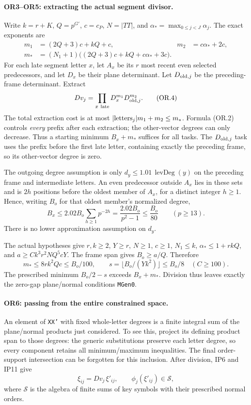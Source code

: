 \documentclass[11pt,a4paper]{article}
\numberwithin{equation}{section}
\theoremstyle{remark}\newtheorem{remark}[theorem]{Remark}
\begin{document}
\paragraph{OR3--OR5: extracting the actual segment divisor.}
Write $k=r+K$, $Q=p^{G'}$, $c=c_P$, $N=|TT|$, and
$\alpha_*=\max_{0\le j<J}\alpha_j$. The exact exponents are
\[
\begin{aligned}
m_1&=(2Q+3)c+kQ+c,&m_2&=c\alpha_*+2c,\\
m_*&=(N_1+1)\bigl((2Q+3)c+kQ+c\alpha_*+3c\bigr).
\end{aligned}                                                   \tag{OR.3}
\]
For each late segment letter $x$, let $A_x$ be its $r$ most recent even
selected predecessors, and let $D_x$ be their plane determinant.
Let $D_{{\rm old},j}$ be the preceding-frame determinant. Extract
\[
                 Dv_j=\prod_{x\ {\rm late}}D_x^{m_1}D_{{\rm old},j}^{m_2}.
                                                               \tag{OR.4}
\]
The total extraction cost is at most $|{\rm letters}_j|m_1+m_2\le m_*$.
Formula (OR.2) controls \emph{every} prefix after each extraction; the
other-vector degrees can only decrease. Thus a starting minimum
$B_x+m_*$ suffices for all tasks. The $D_{{\rm old},j}$ task uses the prefix before
the first late letter, containing exactly the preceding frame, so its
other-vector degree is zero.

The outgoing degree assumption is only $d_y\le1.01\,\operatorname{levDeg}(y)$
on the preceding frame and intermediate letters. An even predecessor
outside $A_x$ lies in these sets and is $2h$ positions before the oldest
member of $A_x$, for a distinct integer $h\ge1$. Hence, writing $B_o$ for
that oldest member's normalized degree,
\[
 B_x\le2.02B_o\sum_{h\ge1}p^{-2h}
       =\frac{2.02B_o}{p^2-1}\le\frac{B_o}{80}
       \qquad(p\ge13).                                    \tag{OR.5}
\]
There is no lower approximation assumption on $d_y$.

The actual hypotheses give $r,k\ge2$, $Y\ge r$, $N\ge1$, $c\ge1$,
$N_1\le k$, $\alpha_*\le1+rkQ$, and
$a\ge Ck^3r^2NQ^5cY$. The frame span gives $B_o\ge a/Q$. Therefore
\[
 m_*\le8rk^2Qc\le B_o/100,\qquad
 s=\lfloor B_o/(Yk^2)\rfloor\le B_o/8
 \quad(C\ge100).
\]
The prescribed minimum $B_o/2-s$ exceeds $B_x+m_*$.
Division thus leaves exactly the zero-gap plane/normal conditions
\texttt{MGen0}.

\paragraph{OR6: passing from the entire constrained space.}
An element of \texttt{XX'} with fixed whole-letter degrees is a finite
integral sum of the plane/normal products just considered. To see this,
project its defining product span to those degrees: the generic
substitutions preserve each letter degree, so every component retains all
minimum/maximum inequalities. The final order-support intersection can
be forgotten for this inclusion. After division, IP6 and IP11 give
\[
 \xi_{ij}=Dv_j\,\xi'_{ij},\qquad
 \phi_j(\xi'_{ij})\in\mathcal S,
\]
where $\mathcal S$ is the algebra of finite sums of key symbols with their
prescribed normal orders.
\end{document}
